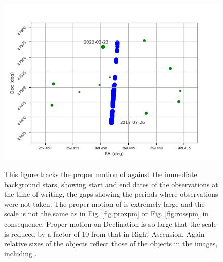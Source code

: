 {\begin{figure}[!htbp]
\begin{center}
\includegraphics[scale=.8]{images/pmbstar.png} \\
\end{center}
\caption{This figure tracks the proper motion of {\bstar} against the immediate
background stars, showing start and end dates of the observations at the time
of writing, the gaps showing the periods where observations were not taken. The proper motion of {\bstar} is
extremely large and the scale is not the same as in Fig. \ref{fig:proxpm} or
Fig.  \ref{fig:rosspm} in consequence. Proper motion on Declination is so large
that the scale is reduced by a factor of 10 from that in Right Ascension.
Again relative sizes of the objects reflect those of the objects in the images,
including \bstar.} \protect\label{fig:bspm}
\end{figure}

}
